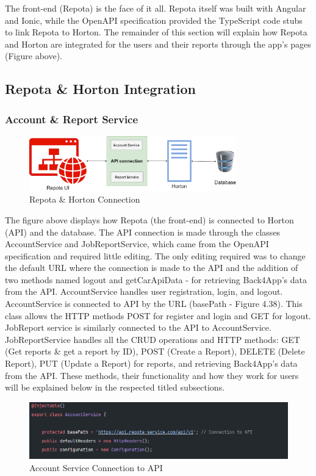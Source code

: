 The front-end (Repota) is the face of it all. Repota itself was built with Angular and Ionic, while the OpenAPI specification provided the TypeScript code stubs to link Repota to Horton. The remainder of this section will explain how Repota and Horton are integrated for the users and their reports through the app's pages (Figure above).

\subsection{Repota \& Horton Integration}
\subsubsection{Account \& Report Service}
\begin{figure}[H]
    \caption{Repota \& Horton Connection}
    \label{image:repotaNhorton}
    \centering
    \includegraphics[width=0.8\textwidth]{images/repota_and_horton/repota_n_horton.png}
\end{figure}

The figure above displays how Repota (the front-end) is connected to Horton (API) and the database. The API connection is made through the classes AccountService and JobReportService, which came from the OpenAPI specification and required little editing. The only editing required was to change the default URL where the connection is made to the API and the addition of two methods named logout and getCarApiData - for retrieving Back4App's data from the API. AccountService handles user registration, login, and logout. AccountService is connected to API by the URL (basePath - Figure 4.38). This class allows the HTTP methods POST for register and login and GET for logout. JobReport service is similarly connected to the API to AccountService. JobReportService handles all the CRUD operations and HTTP methods: GET (Get reports \& get a report by ID), POST (Create a Report), DELETE (Delete Report), PUT (Update a Report) for reports, and retrieving Back4App's data from the API. These methods, their functionality and how they work for users will be explained below in the respected titled subsections.

\begin{figure}[H]
    \caption{Account Service Connection to API}
    \label{image:a-s-conn}
    \centering
    \includegraphics[width=1.0\textwidth]{images/repota_and_horton/account_service.png}
\end{figure}


